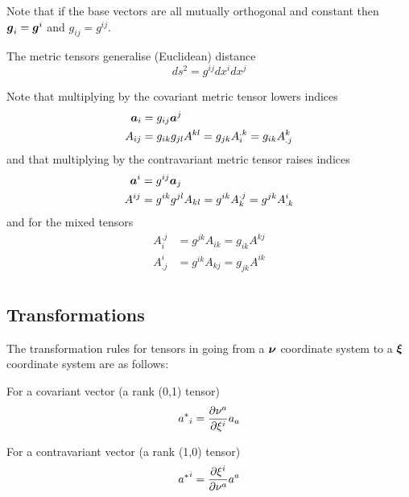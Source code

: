 Note that if the base vectors are all mutually orthogonal and constant then
$\vect{g}_{i}=\vect{g}^{i}$ and $g_{ij}=g^{ij}$.

The metric tensors generalise (Euclidean) distance \ie
\begin{equation}
  ds^{2}=g^{ij}dx^{i}dx^{j}
\end{equation}

Note that multiplying by the covariant metric tensor lowers indices \ie
\begin{equation}
  \begin{split}
    \vect{A}_{i} &= g_{ij}\vect{A}^{j} \\
    A_{ij} &= g_{ik}g_{jl}A^{kl} = g_{jk}A_{i}^{.k} = g_{ik}A^{k}_{.j} 
  \end{split}
\end{equation}
and that multiplying by the contravariant metric tensor raises indices \ie
\begin{equation}
  \begin{split}
  \vect{A}^{i} &=  g^{ij}\vect{A}_{j} \\
   A^{ij} &= g^{ik}g^{jl}A_{kl} = g^{ik}A_{k}^{.j} = g^{jk}A^{i}_{.k}
  \end{split}
\end{equation}
and for the mixed tensors
\begin{equation}
  \begin{split}
  A_{i}^{.j} &= g^{jk}A_{ik} = g_{ik}A^{kj} \\
  A^{i}_{.j} &= g^{ik}A_{kj} = g_{jk}A^{ik} \\
  \end{split}
\end{equation}

\subsection{Transformations}

The transformation rules for tensors in going from a $\vect{\nu}$ coordinate
system to a $\vect{\xi}$ coordinate system are as follows: 


For a covariant vector (a rank (0,1) tensor)
\begin{equation}
  {a^{*}}_{i}= \dfrac{\partial \nu^{a}}{\partial \xi^{i}} a_{a}
\end{equation}

For a contravariant vector (a rank (1,0) tensor)
\begin{equation}
  {a^{*}}^{i}= \dfrac{\partial \xi^{i}}{\partial \nu^{a}} a^{a}
\end{equation}

